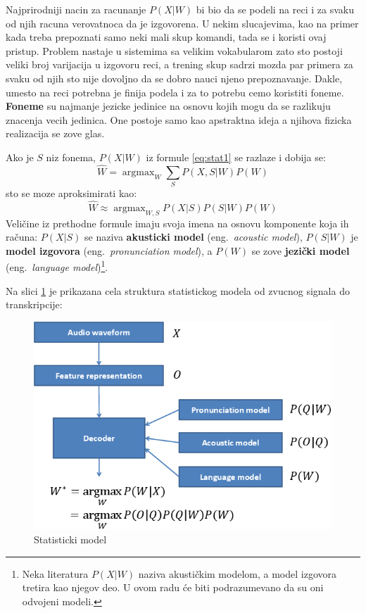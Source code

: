 \documentclass[a4paper]{article}
\DeclareMathOperator*{\argmax}{argmax}
\begin{document}
Najprirodniji nacin za racunanje $P(X|W)$ bi bio da se podeli na reci i za svaku od njih racuna verovatnoca da je izgovorena.
U nekim slucajevima, kao na primer kada treba prepoznati samo neki mali skup komandi, tada se i koristi ovaj pristup.
Problem nastaje u sistemima sa velikim vokabularom zato sto postoji veliki broj varijacija u izgovoru reci, a trening skup sadrzi mozda par primera za svaku od njih sto nije dovoljno da se dobro nauci njeno prepoznavanje.
Dakle, umesto na reci potrebna je finija podela i za to potrebu cemo koristiti foneme.
\textbf{Foneme} su najmanje jezicke jedinice na osnovu kojih mogu da se razlikuju znacenja vecih jedinica.
One postoje samo kao apstraktna ideja a njihova fizicka realizacija se zove glas.

Ako je $S$ niz fonema, $P(X|W)$ iz formule \ref{eq:stat1} se razlaze i dobija se:
\begin{equation*}
  \hat{W} = \argmax_{W} \sum_{S} P(X,S|W) P(W)
\end{equation*}
sto se moze aproksimirati kao:
\begin{equation}
  \label{eq:stat2}
  \hat{W} \approx \argmax_{W,S} P(X|S) P(S|W) P(W)
\end{equation}
Veličine iz prethodne formule imaju svoja imena na osnovu komponente koja ih računa:
$P(X|S)$ se naziva \textbf{akusticki model} (eng.~{\em acoustic model}), 
$P(S|W)$ je \textbf{model izgovora} (eng.~{\em pronunciation model}),
a $P(W)$ se zove \textbf{jezički model} (eng.~{\em language model})\footnote{Neka literatura $P(X|W)$ naziva akustičkim modelom, a model izgovora tretira kao njegov deo. U ovom radu će biti podrazumevano da su oni odvojeni modeli.}.

Na slici \ref{fig:statistical_model} je prikazana cela struktura statistickog modela od zvucnog signala do transkripcije:
\begin{figure}[h!]
  \begin{center}
    \includegraphics[scale=0.4]{statistical_model.png}
  \end{center}
  \caption{Statisticki model}
  \label{fig:statistical_model}
\end{figure}
\end{document}
